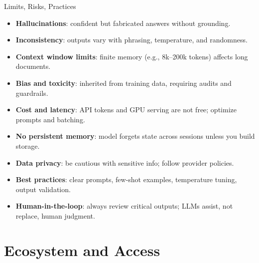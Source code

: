 \documentclass[aspectratio=169]{beamer}
\begin{document}
\begin{frame}{Limits, Risks, Practices}
  \begin{itemize}
    \item \textbf{Hallucinations}: confident but fabricated answers without grounding.
    \item \textbf{Inconsistency}: outputs vary with phrasing, temperature, and randomness.
    \item \textbf{Context window limits}: finite memory (e.g., 8k--200k tokens) affects long documents.
    \item \textbf{Bias and toxicity}: inherited from training data, requiring audits and guardrails.
    \item \textbf{Cost and latency}: API tokens and GPU serving are not free; optimize prompts and batching.
    \item \textbf{No persistent memory}: model forgets state across sessions unless you build storage.
    \item \textbf{Data privacy}: be cautious with sensitive info; follow provider policies.
    \item \textbf{Best practices}: clear prompts, few-shot examples, temperature tuning, output validation.
    \item \textbf{Human-in-the-loop}: always review critical outputs; LLMs assist, not replace, human judgment.
  \end{itemize}
\end{frame}

\section{Ecosystem and Access}
\end{document}

